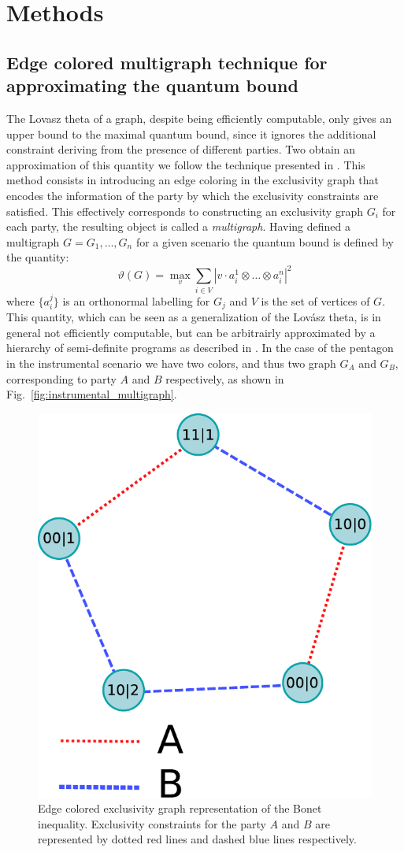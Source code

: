 \documentclass[letterpaper]{article}
\begin{document}
\section*{Methods}
\subsection*{Edge colored multigraph technique for approximating the quantum
bound}
The Lovasz theta of a graph, despite being efficiently computable, only gives an
upper bound to the maximal quantum bound, since it ignores the additional
constraint deriving from the presence of different parties.
Two obtain an approximation of this quantity we follow the technique presented
in \cite{rabelo2014}.
This method consists in introducing an edge coloring in the exclusivity graph
that encodes the information of the party by which the exclusivity constraints
are satisfied.
This effectively corresponds to constructing an exclusivity graph $G_i$ for each
party, the resulting object is called a \emph{multigraph}.
Having defined a multigraph $G = {G_1, \ldots, G_n}$ for a given scenario the
quantum bound is defined by the quantity:
\begin{equation}
    \vartheta(G) = \max_{v} \sum_{i \in V} |v \cdot a^1_i \otimes \dots \otimes a^n_i|^2
    \label{eq:multigraph_lovazs}
\end{equation}
where $\{a^j_i\}$ is an orthonormal labelling for $G_j$ and $V$ is the set of
vertices of $G$.
This quantity, which can be seen as a generalization of the Lov\'asz theta, is
in general not efficiently computable, but can be arbitrairly approximated by a hierarchy of
semi-definite programs as described in \cite{rabelo2014}.
In the case of the pentagon in the instrumental scenario we have two colors, and
thus two graph $G_A$ and $G_B$, corresponding to party $A$ and $B$ respectively,
as shown in Fig.~\ref{fig:instrumental_multigraph}.
\begin{figure}[h]
    \centering
    \includegraphics[width=.7\columnwidth]{images/instrumental_multigraph.pdf}
    \caption{Edge colored exclusivity graph representation of the Bonet
        inequality. Exclusivity constraints for the party $A$ and $B$ are
    represented by dotted red lines and dashed blue lines respectively.}
    \label{fig:2mn_nocycle_proof}
\end{figure}
\end{document}
